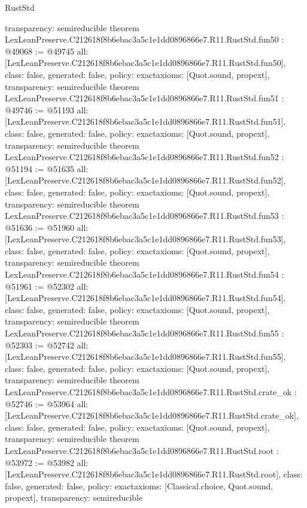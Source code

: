 \begin{lexlean}{RustStd}
\begin{coremodule}
{  transparency: semireducible
}
theorem LexLeanPreserve.C212618f8b6ebac3a5c1e1dd0896866e7.R11.RustStd.fun50 : @49068 := @49745 {
  all: [LexLeanPreserve.C212618f8b6ebac3a5c1e1dd0896866e7.R11.RustStd.fun50],
  class: false,
  generated: false,
  policy: exact{axioms: [Quot.sound, propext]},
  transparency: semireducible
}
theorem LexLeanPreserve.C212618f8b6ebac3a5c1e1dd0896866e7.R11.RustStd.fun51 : @49746 := @51193 {
  all: [LexLeanPreserve.C212618f8b6ebac3a5c1e1dd0896866e7.R11.RustStd.fun51],
  class: false,
  generated: false,
  policy: exact{axioms: [Quot.sound, propext]},
  transparency: semireducible
}
theorem LexLeanPreserve.C212618f8b6ebac3a5c1e1dd0896866e7.R11.RustStd.fun52 : @51194 := @51635 {
  all: [LexLeanPreserve.C212618f8b6ebac3a5c1e1dd0896866e7.R11.RustStd.fun52],
  class: false,
  generated: false,
  policy: exact{axioms: [Quot.sound, propext]},
  transparency: semireducible
}
theorem LexLeanPreserve.C212618f8b6ebac3a5c1e1dd0896866e7.R11.RustStd.fun53 : @51636 := @51960 {
  all: [LexLeanPreserve.C212618f8b6ebac3a5c1e1dd0896866e7.R11.RustStd.fun53],
  class: false,
  generated: false,
  policy: exact{axioms: [Quot.sound, propext]},
  transparency: semireducible
}
theorem LexLeanPreserve.C212618f8b6ebac3a5c1e1dd0896866e7.R11.RustStd.fun54 : @51961 := @52302 {
  all: [LexLeanPreserve.C212618f8b6ebac3a5c1e1dd0896866e7.R11.RustStd.fun54],
  class: false,
  generated: false,
  policy: exact{axioms: [Quot.sound, propext]},
  transparency: semireducible
}
theorem LexLeanPreserve.C212618f8b6ebac3a5c1e1dd0896866e7.R11.RustStd.fun55 : @52303 := @52742 {
  all: [LexLeanPreserve.C212618f8b6ebac3a5c1e1dd0896866e7.R11.RustStd.fun55],
  class: false,
  generated: false,
  policy: exact{axioms: [Quot.sound, propext]},
  transparency: semireducible
}
theorem LexLeanPreserve.C212618f8b6ebac3a5c1e1dd0896866e7.R11.RustStd.crate_ok : @52746 := @53964 {
  all: [LexLeanPreserve.C212618f8b6ebac3a5c1e1dd0896866e7.R11.RustStd.crate_ok],
  class: false,
  generated: false,
  policy: exact{axioms: [Quot.sound, propext]},
  transparency: semireducible
}
theorem LexLeanPreserve.C212618f8b6ebac3a5c1e1dd0896866e7.R11.RustStd.root : @53972 := @53982 {
  all: [LexLeanPreserve.C212618f8b6ebac3a5c1e1dd0896866e7.R11.RustStd.root],
  class: false,
  generated: false,
  policy: exact{axioms: [Classical.choice, Quot.sound, propext]},
  transparency: semireducible
}


\end{coremodule}
\end{lexlean}
